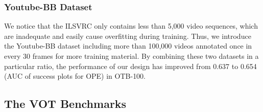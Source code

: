 \documentclass[runningheads]{llncs}
\begin{document}
\subsubsection{Youtube-BB Dataset}

We notice that the ILSVRC only contains less than 5,000 video sequences, which are inadequate and easily cause overfitting during training. Thus, we introduce the Youtube-BB dataset including more than 100,000 videos annotated once in every 30 frames for more training material. By combining these two datasets in a particular ratio, the performance of our design has improved from 0.637 to 0.654 (AUC of success plots for OPE) in OTB-100.

\subsection{The VOT Benchmarks}
\end{document}
